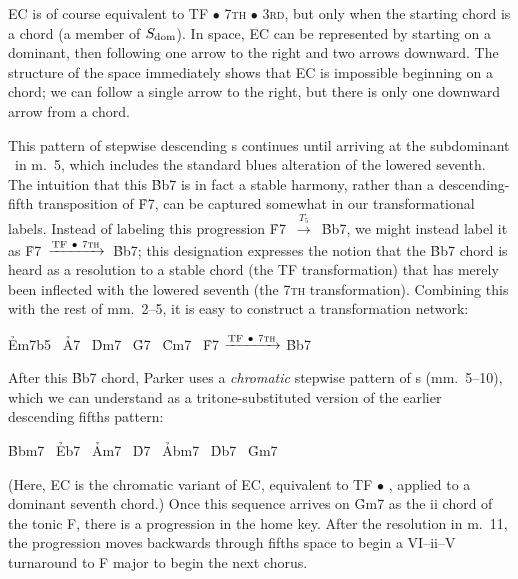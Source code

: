 \noindent EC is of course equivalent to TF $\bullet$ \textsc{7th} $\bullet$
\textsc{3rd}, but only when the starting chord is a \V chord (a member of
$S_{\mathrm{dom}}$). In \tf space, EC can be represented by starting on a dominant, then
following one arrow to the right and two arrows downward. The structure of the
space immediately shows that EC is impossible beginning on a \ii chord; we can
follow a single arrow to the right, but there is only one downward arrow from
a \V chord.

This pattern of stepwise descending \tf{}s continues until arriving at the
subdominant \Bflat\ in m.~5, which includes the standard blues alteration of
the lowered seventh. The intuition that this \h{Bb7} is in fact a
stable harmony, rather than a descending-fifth transposition of \h{F7}, can be
captured somewhat in our transformational labels. Instead of labeling this progression
\mbox{\h{F7} $\xrightarrow{T_5}$ \h{Bb7}}, we might instead label it as
\mbox{\h{F7} $\xrightarrow{\mathrm{TF}\ \bullet\ \text{\textsc{7th}}}$ \h{Bb7}};
this designation expresses the notion that the \h{Bb7} chord is heard as a
resolution to a stable chord (the TF transformation) that has merely been
inflected with the lowered seventh (the \textsc{7th} transformation).
Combining this with the rest of mm.~2--5, it is easy to construct a
transformation network:

\begin{center}
  \h{Em7b5} \TFarrow\ \h{A7} \ECarrow\
  \h{Dm7}   \TFarrow\ \h{G7} \ECarrow\
  \h{Cm7}   \TFarrow\ \h{F7} $\xrightarrow{\mathrm{TF}\ \bullet\ \text{\textsc{7th}}}$
  \h{Bb7}
\end{center}

After this \h{Bb7} chord, Parker uses a \emph{chromatic} stepwise pattern of \tf{}s
(mm.~5--10), which we can understand as a tritone-substituted version of the
earlier descending fifths pattern:

\begin{center}
  \h{Bbm7} \TFarrow\ \h{Eb7} \ECCarrow\
  \h{Am7}  \TFarrow\ \h{D7}  \ECCarrow\
  \h{Abm7} \TFarrow\ \h{Db7} \ECCarrow\
  \h{Gm7}
\end{center}

\noindent (Here, EC\tsub{C} is the chromatic variant of EC, equivalent to TF
$\bullet$ \slideS, applied to a dominant seventh chord.) Once this sequence
arrives on \h{Gm7} as the ii chord of the tonic F, there is a \tfo progression
in the home key. After the resolution in m.~11, the progression moves
backwards through fifths space to begin a VI--ii--V turnaround to F major to
begin the next chorus.\fn{tft-8}

